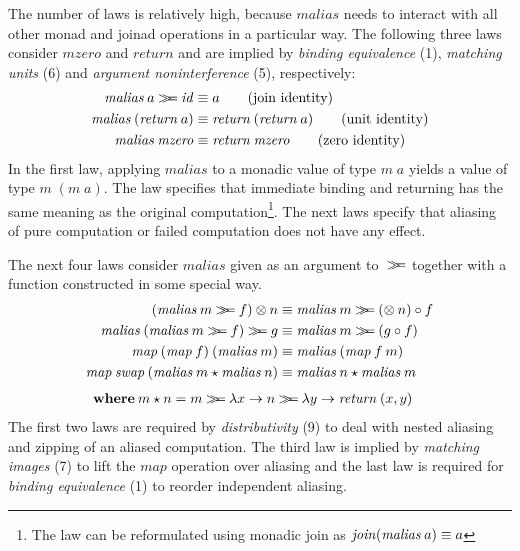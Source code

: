 \documentclass{sigplanconf}
\newcommand{\Varid}[1]{\mathit{#1}}
\newcommand{\bind}{\mathbin{>\!\!\!>\mkern-6.7mu=}}
\begin{document}
The number of laws is relatively high, because \ensuremath{\Varid{malias}} needs to interact with all other 
monad and joinad operations in a particular way. The following three laws consider \ensuremath{\Varid{mzero}} and \ensuremath{\Varid{return}}
and are implied by \textit{binding equivalence} (1), \textit{matching units} (6) and \textit{argument
noninterference} (5), respectively:
\begin{align*}
\malias \: a \bind \Varid{id} &\equiv a \tag{join identity} \\
\malias \: (\Varid{return} \: a) &\equiv \Varid{return} \: (\Varid{return} \: a) \tag{unit identity} \\
\malias \: \mzero &\equiv \Varid{return} \: \mzero \tag{zero identity}
\end{align*}
In the first law, applying \ensuremath{\Varid{malias}} to a monadic value of type \ensuremath{\Varid{m}\;\Varid{a}} yields a value of type 
\ensuremath{\Varid{m}\;(\Varid{m}\;\Varid{a})}. The law specifies that immediate binding and returning has the same meaning as the original
computation\footnote{The law can be reformulated using monadic join as $\Varid{join} (\malias \: a) \equiv a$}.
The next laws specify that aliasing of pure computation or failed computation does not have any effect. 

The next four laws consider \ensuremath{\Varid{malias}} given as an argument to~\ensuremath{\bind } together with a function constructed
in some special way. 
\begin{align*}
(\malias \: m \bind f) \mzip n &\equiv \malias \: m \bind (\mzip \: n) \circ f \\ %
\malias \: (\malias \: m \bind f) \bind g &\equiv \malias \: m \bind (g \circ f) \\ %
\map \: (\map \: f) \: (\malias \: m) &\equiv \malias \: (\map \: f \: m) \\ %
\map \: \Varid{swap} \: (\malias \: m \star \malias \: n) &\equiv \malias \: n \star \malias \: m 
\end{align*}
\begin{align*}
  \textbf{where} \: &m \star n = m \bind \lambda x \rightarrow n \bind \lambda y \rightarrow \Varid{return} \: (x, y)
\end{align*}
The first two laws are required by \textit{distributivity} (9) to 
deal with nested aliasing and zipping of an aliased computation. The third law is implied by
\textit{matching images} (7) to lift the \ensuremath{\Varid{map}} operation over aliasing and the last law is required
for \textit{binding equivalence} (1) to reorder independent aliasing.
\end{document}
